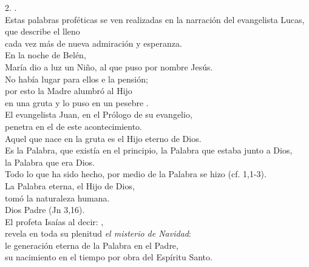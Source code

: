 2. .\\ Estas palabras proféticas se ven realizadas en la narración del evangelista Lucas, \\ que describe el  lleno\\ cada vez más de nueva admiración y esperanza.\\ En la noche de Belén,\\ María dio a luz un Niño, al que puso por nombre Jesús.\\ No había lugar para ellos e la pensión;\\ por esto la Madre alumbró al Hijo\\ en una gruta y lo puso en un pesebre .\\ El evangelista Juan, en el Prólogo de su evangelio,\\ penetra en el  de este acontecimiento.\\ Aquel que nace en la gruta es el Hijo eterno de Dios.\\ Es la Palabra, que existía en el principio, la Palabra que estaba junto a Dios,\\ la Palabra que era Dios.\\ Todo lo que ha sido hecho, por medio de la Palabra se hizo (cf. 1,1-3).\\ La Palabra eterna, el Hijo de Dios,\\ tomó la naturaleza humana.\\ Dios Padre  (Jn 3,16).\\ El profeta Isaías al decir: ,\\ revela en toda su plenitud \emph{el misterio de Navidad}:\\ le generación eterna de la Palabra en el Padre,\\ su nacimiento en el tiempo por obra del Espíritu Santo.


